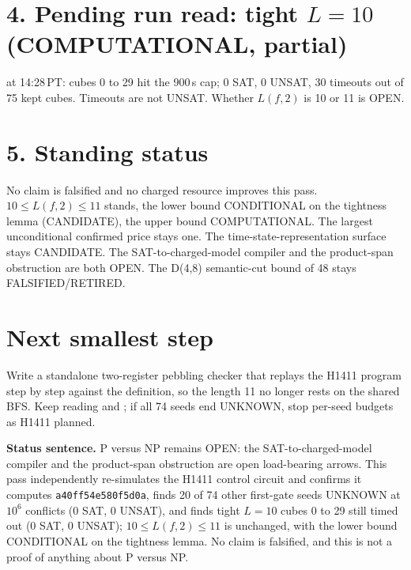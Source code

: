 \documentclass[11pt]{article}
\begin{document}
\section*{4. Pending run read: tight $L=10$ (COMPUTATIONAL, partial)}
 at 14:28\,PT: cubes 0 to 29 hit the 900\,s cap; 0 SAT, 0 UNSAT, 30 timeouts out of 75 kept cubes. Timeouts are not UNSAT. Whether $L(f,2)$ is 10 or 11 is OPEN.

\section*{5. Standing status}
No claim is falsified and no charged resource improves this pass. $10\le L(f,2)\le 11$ stands, the lower bound CONDITIONAL on the tightness lemma (CANDIDATE), the upper bound COMPUTATIONAL. The largest unconditional confirmed price stays one. The time-state-representation surface stays CANDIDATE. The SAT-to-charged-model compiler and the product-span obstruction are both OPEN. The D(4,8) semantic-cut bound of 48 stays FALSIFIED/RETIRED.

\section*{Next smallest step}
Write a standalone two-register pebbling checker that replays the H1411 program step by step against the definition, so the length 11 no longer rests on the shared BFS. Keep reading  and ; if all 74 seeds end UNKNOWN, stop per-seed budgets as H1411 planned.

\bigskip
\noindent\textbf{Status sentence.} P versus NP remains OPEN: the SAT-to-charged-model compiler and the product-span obstruction are open load-bearing arrows. This pass independently re-simulates the H1411 control circuit and confirms it computes \texttt{a40ff54e580f5d0a}, finds 20 of 74 other first-gate seeds UNKNOWN at $10^6$ conflicts (0 SAT, 0 UNSAT), and finds tight $L=10$ cubes 0 to 29 still timed out (0 SAT, 0 UNSAT); $10\le L(f,2)\le 11$ is unchanged, with the lower bound CONDITIONAL on the tightness lemma. No claim is falsified, and this is not a proof of anything about P versus NP.
\end{document}
